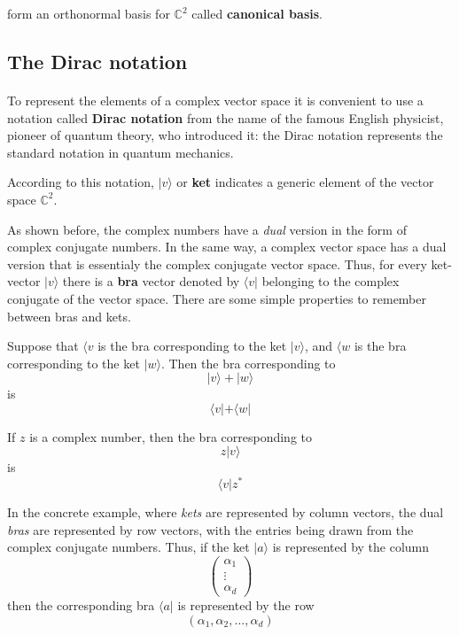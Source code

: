 \documentclass[a4paper,10pt]{article}
\begin{document}
form an orthonormal basis for ${\mathbb{C}}^2$ called \textbf{canonical basis}. 

\subsection{The Dirac notation}
\label{diracNotation}
\paragraph{} To represent the elements of a complex vector space it is convenient to use a notation called \textbf{Dirac notation} from the name of the famous English physicist, pioneer of quantum theory, who introduced it: the Dirac notation represents the standard notation in quantum mechanics.

According to this notation, $|v\rangle$ or \textbf{ket} indicates a generic element of the vector space ${\mathbb{C}}^2$.

As shown before, the complex numbers have a \textit{dual} version in the form of complex conjugate numbers. In the same way, a complex vector space has a dual version that is essentialy the complex conjugate vector space. Thus, for every ket-vector $|v\rangle$ there is a \textbf{bra} vector denoted by $\langle v|$ belonging to the complex conjugate of the vector space. There are some simple properties to remember between bras and kets.

Suppose that $\langle v$ is the bra corresponding to the ket $|v\rangle$, and $\langle w$ is the bra corresponding to the ket $|w\rangle$. Then the bra corresponding to
\begin{equation*}
|v\rangle + |w\rangle
\end{equation*}
is
\begin{equation*}
\langle v| + \langle w|
\end{equation*}

If $z$ is a complex number, then the bra corresponding to 
\begin{equation*}
z|v\rangle
\end{equation*}
is
\begin{equation*}
\langle v|z^*
\end{equation*}

In the concrete example, where \textit{kets} are represented by column vectors, the dual \textit{bras} are represented by row vectors, with the entries being drawn from the complex conjugate numbers. Thus, if the ket $|a\rangle$ is represented by the column
\begin{equation*}
\begin{pmatrix}
    \alpha_1\\
    \vdots\\
    \alpha_d
\end{pmatrix}
\end{equation*}
then the corresponding bra $\langle a|$ is represented by the row
\begin{equation}
(\alpha_1, \alpha_2, \ldots, \alpha_d)
\label{eq:braOfKetDefinition}
\end{equation}
\end{document}
